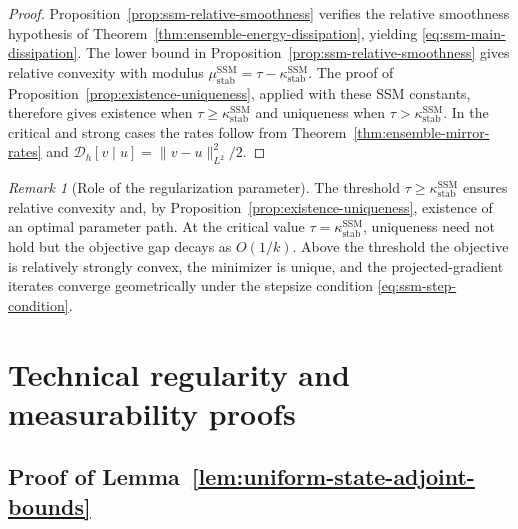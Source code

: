 \documentclass[11pt]{amsart}
\numberwithin{equation}{section} %
\theoremstyle{remark}
\newtheorem{remark}{Remark}[section]
\begin{document}
\begin{proof}
Proposition~\ref{prop:ssm-relative-smoothness} verifies the relative
smoothness hypothesis of
Theorem~\ref{thm:ensemble-energy-dissipation}, yielding
\eqref{eq:ssm-main-dissipation}.
The lower bound in Proposition~\ref{prop:ssm-relative-smoothness}
gives relative convexity with modulus
$\mu_{\mathrm{stab}}^{\mathrm{SSM}}
=\tau-\kappa_{\mathrm{stab}}^{\mathrm{SSM}}$.
The proof of Proposition~\ref{prop:existence-uniqueness}, applied with
these SSM constants, therefore gives existence when
$\tau\ge\kappa_{\mathrm{stab}}^{\mathrm{SSM}}$ and uniqueness when
$\tau>\kappa_{\mathrm{stab}}^{\mathrm{SSM}}$.
In the critical and strong cases the rates follow from
Theorem~\ref{thm:ensemble-mirror-rates} and
$\mathcal D_h[v\mid u]=\|v-u\|_{L^2}^2/2$.
\end{proof}

\begin{remark}[Role of the regularization parameter]
\label{rem:ssm-tau-role}
The threshold
$\tau\ge\kappa_{\mathrm{stab}}^{\mathrm{SSM}}$ ensures relative
convexity and, by Proposition~\ref{prop:existence-uniqueness}, existence
of an optimal parameter path. At the critical value
$\tau=\kappa_{\mathrm{stab}}^{\mathrm{SSM}}$, uniqueness need not hold
but the objective gap decays as $O(1/k)$. Above the threshold the
objective is relatively strongly convex, the minimizer is unique, and
the projected-gradient iterates converge geometrically under the
stepsize condition \eqref{eq:ssm-step-condition}.
\end{remark}

\appendix

\section{Technical regularity and measurability proofs}
\label{app:regularity-measurability}

\subsection{Proof of Lemma~\ref{lem:uniform-state-adjoint-bounds}}
\label{app:regularity-state-adjoint}
\end{document}
